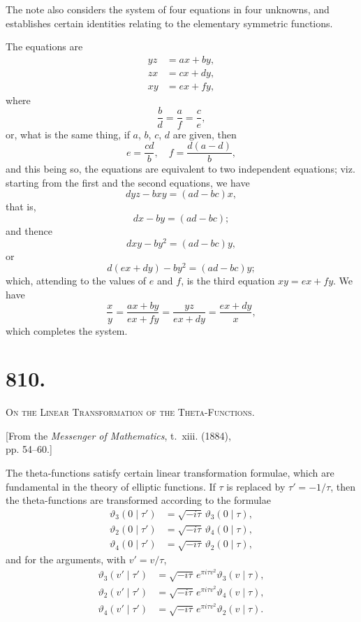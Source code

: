 \documentclass[11pt,a4paper]{book}
\begin{document}
The note also considers the system of four equations in four unknowns, and establishes certain identities relating to the elementary symmetric functions.

The equations are
\[
\begin{aligned}
yz &= ax + by, \\
zx &= cx + dy, \\
xy &= ex + fy,
\end{aligned}
\]
where
\[
\frac{b}{d} = \frac{a}{f} = \frac{c}{e},
\]
or, what is the same thing, if $a$, $b$, $c$, $d$ are given, then
\[
e = \frac{cd}{b}, \quad f = \frac{d(a-d)}{b},
\]
and this being so, the equations are equivalent to two independent equations; viz. starting from the first and the second equations, we have
\[
dyz - bxy = (ad - bc)x,
\]
that is,
\[
dx - by = (ad - bc);
\]
and thence
\[
dxy - by^2 = (ad - bc)y,
\]
or
\[
d(ex + dy) - by^2 = (ad - bc)y;
\]
which, attending to the values of $e$ and $f$, is the third equation $xy = ex + fy$. We have
\[
\frac{x}{y} = \frac{ax + by}{ex + fy} = \frac{yz}{ex + dy} = \frac{ex + dy}{x},
\]
which completes the system.



\newpage
\section*{810.}
\begin{center}
{\large\scshape On the Linear Transformation of the Theta-Functions.}
\end{center}

\begin{flushright}
\small[From the \textit{Messenger of Mathematics}, t.~xiii. (1884),\\
pp. 54--60.]
\end{flushright}

The theta-functions satisfy certain linear transformation formulae, which are fundamental in the theory of elliptic functions. If $\tau$ is replaced by $\tau' = -1/\tau$, then the theta-functions are transformed according to the formulae
\[
\begin{aligned}
\vartheta_3(0 \mid \tau') &= \sqrt{-i\tau} \, \vartheta_3(0 \mid \tau), \\
\vartheta_2(0 \mid \tau') &= \sqrt{-i\tau} \, \vartheta_4(0 \mid \tau), \\
\vartheta_4(0 \mid \tau') &= \sqrt{-i\tau} \, \vartheta_2(0 \mid \tau),
\end{aligned}
\]
and for the arguments, with $v' = v/\tau$,
\[
\begin{aligned}
\vartheta_3(v' \mid \tau') &= \sqrt{-i\tau} \, e^{\pi i \tau v^2} \vartheta_3(v \mid \tau), \\
\vartheta_2(v' \mid \tau') &= \sqrt{-i\tau} \, e^{\pi i \tau v^2} \vartheta_4(v \mid \tau), \\
\vartheta_4(v' \mid \tau') &= \sqrt{-i\tau} \, e^{\pi i \tau v^2} \vartheta_2(v \mid \tau).
\end{aligned}
\]
\end{document}
